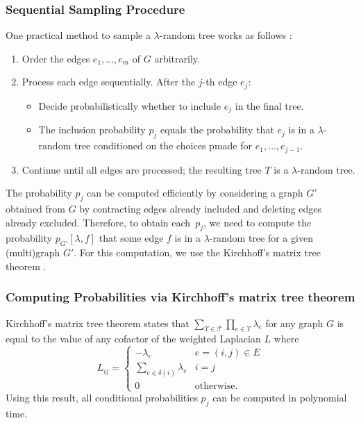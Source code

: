 \documentclass[12pt]{report}
\theoremstyle{definition}
\begin{document}
\subsubsection*{Sequential Sampling Procedure}
One practical method to sample a $\lambda$-random tree works as follows \cite{Kulkarni_sampling}:
\begin{enumerate}
    \item Order the edges $e_1, \dots, e_m$ of $G$ arbitrarily.
    \item Process each edge sequentially. After the $j$-th edge $e_j$:
    \begin{itemize}
        \item Decide probabilistically whether to include $e_j$ in the final tree.
        \item The inclusion probability $p_j$ equals the probability that $e_j$ is in a $\lambda$-random tree conditioned on the choices pmade for $e_1,\dots,e_{j-1}$.
    \end{itemize}
    \item Continue until all edges are processed; the resulting tree $T$ 
    is a $\lambda$-random tree.
\end{enumerate}
The probability $p_j$ can be computed efficiently by considering a graph $G'$ obtained from $G$ by contracting edges already included and deleting edges already excluded. Therefore, to obtain each~$p_j$, we need to compute the probability $p_{G'}[\lambda,f]$ that some edge $f$ is in a $\lambda$-random tree for a given (multi)graph $G'$. For this computation, we use the Kirchhoff's matrix tree theorem \cite[pp.~50--60]{bollobas2002modern}. 

\subsubsection*{Computing Probabilities via Kirchhoff's matrix tree theorem}

Kirchhoff's matrix tree theorem states that $\sum_{T \in \mathcal{T}} \prod_{e \in T} \lambda_e$ for any graph $G$ is equal to the value of any cofactor of the weighted Laplacian $L$ where
\[
L_{ij} = \begin{cases} -\lambda_e & e = (i,j) \in E \\ \sum_{e \in \delta({i})} \lambda_e & i=j \\ 0 & \mbox{otherwise}. \end{cases}
\]
Using this result, all conditional probabilities $p_j$ can be computed in polynomial time. 
\end{document}

